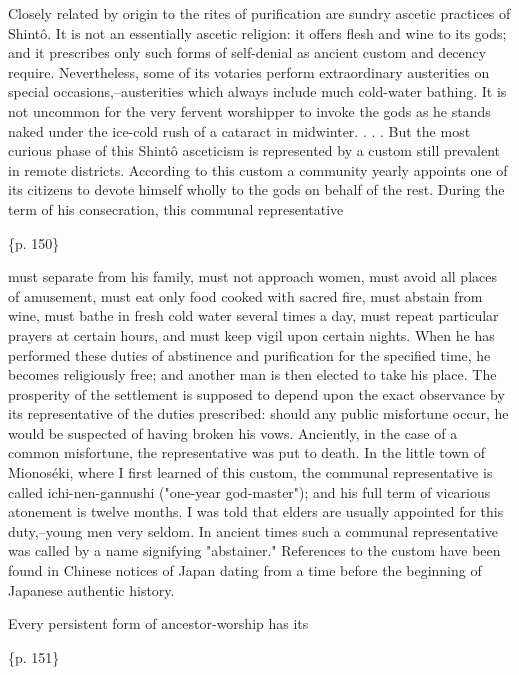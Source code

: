 Closely related by origin to the rites of purification are sundry ascetic practices of Shintô. It is not an essentially ascetic religion: it offers flesh and wine to its gods; and it prescribes only such forms of self-denial as ancient custom and decency require. Nevertheless, some of its votaries perform extraordinary austerities on special occasions,--austerities which always include much cold-water bathing. It is not uncommon for the very fervent worshipper to invoke the gods as he stands naked under the ice-cold rush of a cataract in midwinter. . . . But the most curious phase of this Shintô asceticism is represented by a custom still prevalent in remote districts. According to this custom a community yearly appoints one of its citizens to devote himself wholly to the gods on behalf of the rest. During the term of his consecration, this communal representative

\{p. 150\}

must separate from his family, must not approach women, must avoid all places of amusement, must eat only food cooked with sacred fire, must abstain from wine, must bathe in fresh cold water several times a day, must repeat particular prayers at certain hours, and must keep vigil upon certain nights. When he has performed these duties of abstinence and purification for the specified time, he becomes religiously free; and another man is then elected to take his place. The prosperity of the settlement is supposed to depend upon the exact observance by its representative of the duties prescribed: should any public misfortune occur, he would be suspected of having broken his vows. Anciently, in the case of a common misfortune, the representative was put to death. In the little town of Mionoséki, where I first learned of this custom, the communal representative is called ichi-nen-gannushi ("one-year god-master"); and his full term of vicarious atonement is twelve months. I was told that elders are usually appointed for this duty,--young men very seldom. In ancient times such a communal representative was called by a name signifying "abstainer." References to the custom have been found in Chinese notices of Japan dating from a time before the beginning of Japanese authentic history.



Every persistent form of ancestor-worship has its

\{p. 151\}

